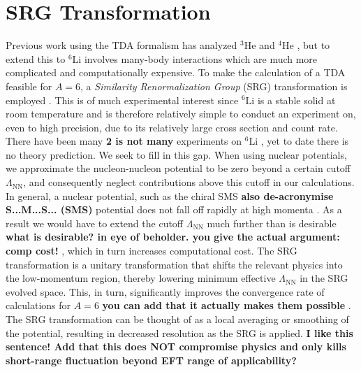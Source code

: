 \documentclass[a4paper,11pt]{article}
\newcommand{\LamNN}{\Lambda_{\mathrm{NN}}}
\newcommand{\LiS}{{}^{6} \mathrm{Li} }
\newcommand{\HeF}{{}^{4} \mathrm{He}}
\newcommand{\HeT}{{}^{3} \mathrm{He}}
\newcommand{\com}[1]{\color{blue}\small\textbf{ #1 }\color{black}\normalsize}
\begin{document}
\section{SRG Transformation}
Previous work using the TDA formalism has analyzed
$\HeT$ and $\HeF$
\cite{hammer2020, hammer4He}, but to extend this to $\LiS$ involves many-body
interactions which are much more complicated and computationally expensive.
To make the calculation of a TDA feasible for $A=6$, a
\textit{Similarity Renormalization Group} (SRG) transformation
is employed \cite{SRG, Furnstahl2013}.
This is of much experimental interest since $\LiS$ is a stable solid at room temperature and is
therefore relatively simple to conduct an experiment on, even to high precision, due to its relatively large
cross section and count rate.
There have been many\com{2 is not many} experiments on $\LiS$ \cite{60MeV,86MeV}, yet to date there is no theory prediction.
We seek to fill in this gap.
When using nuclear potentials, we approximate the nucleon-nucleon potential to be zero
beyond a certain cutoff $\LamNN$, and consequently
neglect contributions above this cutoff in our calculations.
In general, a nuclear potential, such as the chiral SMS \com{also de-acronymise S...M...S... (SMS)} potential does
not fall off rapidly at high momenta \cite{Reinert2018}.
As a result we would have to
extend the cutoff $\LamNN$ much further than is desirable\com{what is desirable? in eye of beholder. you give the actual argument: comp cost!}, which in turn
increases computational cost.
The SRG transformation is a unitary transformation that
shifts the relevant physics into the low-momentum
region, thereby lowering minimum effective $\LamNN$ in the SRG evolved space.
This, in turn, significantly improves the convergence rate of calculations for $A=6$ \com{you can add that it actually makes them possible}.
The SRG transformation can be thought of as a local averaging or
smoothing of the potential, resulting in decreased resolution
as the SRG is applied.\com{I like this sentence! Add that this does NOT compromise physics and only kills short-range fluctuation beyond EFT range of applicability?}
\end{document}
